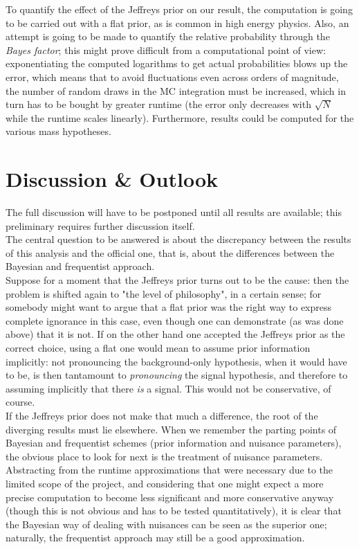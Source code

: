 \documentclass[aps,prb,twocolumn,showpacs,superscriptaddress,groupedaddress]{revtex4}  %
\begin{document}
To quantify the effect of the Jeffreys prior on our result, the computation is going to be carried out with a flat prior, as is common in high energy physics. Also, an attempt is going to be made to quantify the relative probability through the \emph{Bayes factor}; this might prove difficult from a computational point of view: exponentiating the computed logarithms to get actual probabilities blows up the error, which means that to avoid fluctuations even across orders of magnitude, the number of random draws in the MC integration must be increased, which in turn has to be bought by greater runtime (the error only decreases with $\sqrt{N}$ while the runtime scales linearly). Furthermore, results could be computed for the various mass hypotheses.\\

\section{Discussion \& Outlook}
The full discussion will have to be postponed until all results are available; this preliminary requires further discussion itself.\\
The central question to be answered is about the discrepancy between the results of this analysis and the official one, that is, about the differences between the Bayesian and frequentist approach.\\
Suppose for a moment that the Jeffreys prior turns out to be the cause: then the problem is shifted again to "the level of philosophy", in a certain sense; for somebody might want to argue that a flat prior was the right way to express complete ignorance in this case, even though one can demonstrate (as was done above) that it is not. If on the other hand one accepted the Jeffreys prior as the correct choice, using a flat one would mean to assume prior information implicitly: not pronouncing the background-only hypothesis, when it would have to be, is then tantamount to \emph{pronouncing} the signal hypothesis, and therefore to assuming implicitly that there \emph{is} a signal. This would not be conservative, of course.\\
If the Jeffreys prior does not make that much a difference, the root of the diverging results must lie elsewhere. When we remember the parting points of Bayesian and frequentist schemes (prior information and nuisance parameters), the obvious place to look for next is the treatment of nuisance parameters. Abstracting from the runtime approximations that were necessary due to the limited scope of the project, and considering that one might expect a more precise computation to become less significant and more conservative anyway (though this is not obvious and has to be tested quantitatively), it is clear that the Bayesian way of dealing with nuisances can be seen as the superior one; naturally, the frequentist approach may still be a good approximation.\\
\end{document}
